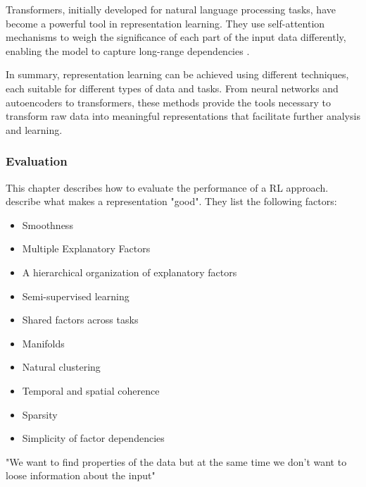 Transformers, initially developed for natural language processing tasks, have become a powerful tool in representation learning. They use self-attention mechanisms to weigh the significance of each part of the input data differently, enabling the model to capture long-range dependencies .

In summary, representation learning can be achieved using different techniques, each suitable for different types of data and tasks. From neural networks and autoencoders to transformers, these methods provide the tools necessary to transform raw data into meaningful representations that facilitate further analysis and learning.
\subsubsection{Evaluation}\label{theory:evaluation}
This chapter describes how to evaluate the performance of a RL approach.
 describe what makes a representation "good". They list the following factors:
\begin{itemize}
  \item Smoothness
  \item Multiple Explanatory Factors
  \item A hierarchical organization of explanatory factors
  \item Semi-supervised learning
  \item Shared factors across tasks
  \item Manifolds
  \item Natural clustering
  \item Temporal and spatial coherence
  \item Sparsity
  \item Simplicity of factor dependencies
\end{itemize}
"We want to find properties of the data but at the same time we don't want to loose information about the input" 
